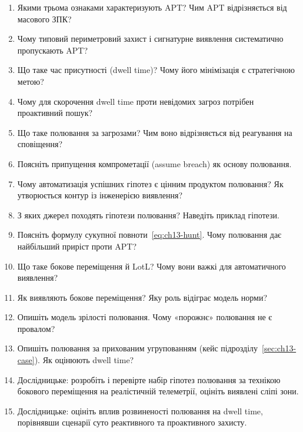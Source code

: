 \selfcheck
\begin{enumerate}
\item Якими трьома ознаками характеризують APT? Чим APT відрізняється від масового ЗПК?
\item Чому типовий периметровий захист і сигнатурне виявлення систематично пропускають APT?
\item Що таке час присутності (dwell time)? Чому його мінімізація є стратегічною метою?
\item Чому для скорочення dwell time проти невідомих загроз потрібен проактивний пошук?
\item Що таке полювання за загрозами? Чим воно відрізняється від реагування на сповіщення?
\item Поясніть припущення компрометації (assume breach) як основу полювання.
\item Чому автоматизація успішних гіпотез є цінним продуктом полювання? Як утворюється контур із інженерією виявлення?
\item З яких джерел походять гіпотези полювання? Наведіть приклад гіпотези.
\item Поясніть формулу сукупної повноти~\eqref{eq:ch13-hunt}. Чому полювання дає найбільший приріст проти APT?
\item Що таке бокове переміщення й LotL? Чому вони важкі для автоматичного виявлення?
\item Як виявляють бокове переміщення? Яку роль відіграє модель норми?
\item Опишіть модель зрілості полювання. Чому «порожнє» полювання не є провалом?
\item Опишіть полювання за прихованим угрупованням (кейс підрозділу~\ref{sec:ch13-case}). Як оцінюють dwell time?
\item Дослідницьке: розробіть і перевірте набір гіпотез полювання за технікою бокового переміщення на реалістичній телеметрії, оцініть виявлені сліпі зони.
\item Дослідницьке: оцініть вплив розвиненості полювання на dwell time, порівнявши сценарії суто реактивного та проактивного захисту.
\end{enumerate}
